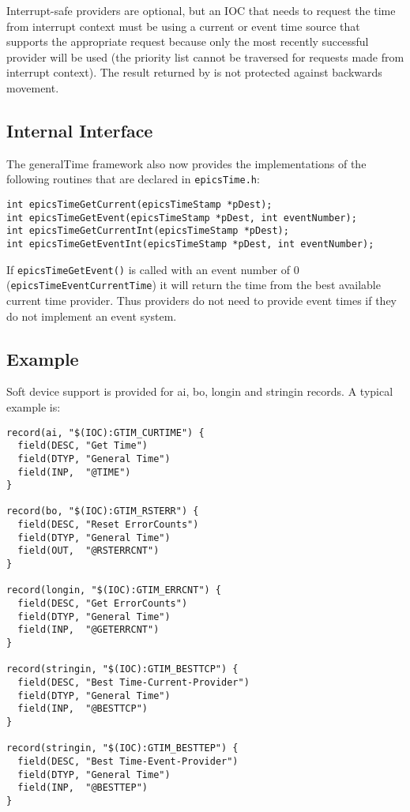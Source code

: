 Interrupt-safe providers are optional, but an IOC that needs to request the time from interrupt context must be using a current or event time source that supports the appropriate request because only the most recently successful provider will 
be used (the priority list cannot be traversed for requests made from interrupt context).
The result returned by is not protected against backwards movement.

\subsection{Internal Interface}

The generalTime framework also now provides the implementations of the following routines that are declared in \verb|epicsTime.h|:

\begin{verbatim}
int epicsTimeGetCurrent(epicsTimeStamp *pDest);
int epicsTimeGetEvent(epicsTimeStamp *pDest, int eventNumber);
int epicsTimeGetCurrentInt(epicsTimeStamp *pDest);
int epicsTimeGetEventInt(epicsTimeStamp *pDest, int eventNumber);
\end{verbatim}

If \verb|epicsTimeGetEvent()| is called with an event number of 0 (\verb|epicsTimeEventCurrentTime|) it will return the time from the best available current time provider.
Thus providers do not need to provide event times if they do not implement an event system.

\subsection{Example}

Soft device support is provided for ai, bo, longin and stringin records.
A typical example is:

\begin{verbatim}
record(ai, "$(IOC):GTIM_CURTIME") {
  field(DESC, "Get Time")
  field(DTYP, "General Time")
  field(INP,  "@TIME")
}

record(bo, "$(IOC):GTIM_RSTERR") {
  field(DESC, "Reset ErrorCounts")
  field(DTYP, "General Time")
  field(OUT,  "@RSTERRCNT")
}

record(longin, "$(IOC):GTIM_ERRCNT") {
  field(DESC, "Get ErrorCounts")
  field(DTYP, "General Time")
  field(INP,  "@GETERRCNT")
}

record(stringin, "$(IOC):GTIM_BESTTCP") {
  field(DESC, "Best Time-Current-Provider")
  field(DTYP, "General Time")
  field(INP,  "@BESTTCP")
}

record(stringin, "$(IOC):GTIM_BESTTEP") {
  field(DESC, "Best Time-Event-Provider")
  field(DTYP, "General Time")
  field(INP,  "@BESTTEP")
}
\end{verbatim}

